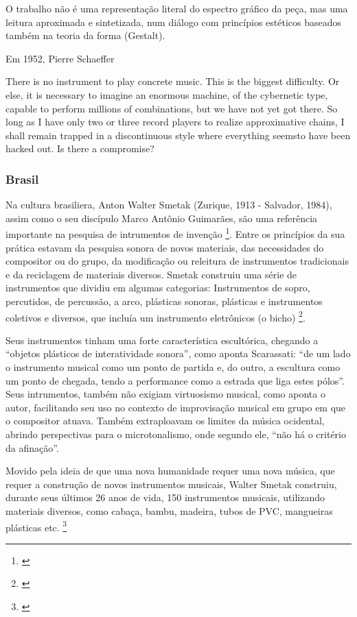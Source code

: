 O trabalho não é uma representação literal do espectro gráfico da peça, mas uma leitura aproximada e sintetizada, num diálogo com princípios estéticos baseados também na teoria da forma (Gestalt).


Em 1952, Pierre Schaeffer 

There is no instrument to play concrete music. This is the biggest difficulty. Or else, it is necessary to imagine an enormous machine, of the cybernetic type, capable to perform millions of combinations, but we have not yet got there. So long as I have only two or three record players to realize approximative chains, I shall remain trapped in a discontinuous style where everything seemsto have been hacked out. Is there a compromise?


\subsubsection{Brasil}
Na cultura brasiliera, Anton Walter Smetak (Zurique, 1913 - Salvador, 1984), assim como o seu discípulo Marco Antônio Guimarães, são uma referência importante na pesquisa de intrumentos de invenção \footnote{\cite{Lima2018, Multimeios2001, Obici2014}}. Entre os princípios da sua prática estavam da pesquisa sonora de novos materiais, das necessidades do compositor ou do grupo, da modificação ou releitura de instrumentos tradicionais e da reciclagem de materiais diversos. Smetak construiu uma série de instrumentos que dividiu em algumas categorias: Instrumentos de sopro, percutidos, de percussão, a arco, plásticas sonoras, plásticas e instrumentos coletivos e diversos, que incluía um instrumento eletrônicos (o bicho) \footnote{\cite{Multimeios2001}}. 

Seus instrumentos tinham uma forte característica escultórica, chegando a ``objetos plásticos de interatividade sonora'', como aponta Scarassati: ``de um lado o instrumento musical como um ponto de partida e, do outro, a escultura como um ponto de chegada, tendo a performance como a estrada que liga estes pólos''. Seus intrumentos, também não exigiam virtuosismo musical, como aponta o autor, facilitando seu uso no contexto de improvisação musical em grupo em que o compositor atuava. Também extraploavam os limites da música ocidental, abrindo perspectivas para o microtonalismo, onde segundo ele, ``não há o critério da afinação''. 

\begin{citacao}
Movido pela ideia de que uma nova humanidade requer uma nova música, que requer a construção de novos instrumentos musicais, Walter Smetak construiu, durante seus últimos 26 anos de vida, 150 instrumentos musicais, utilizando materiais diversos, como cabaça, bambu, madeira, tubos de PVC, mangueiras plásticas etc. \footnote{\cite{Andres2011}}
\end{citacao}


